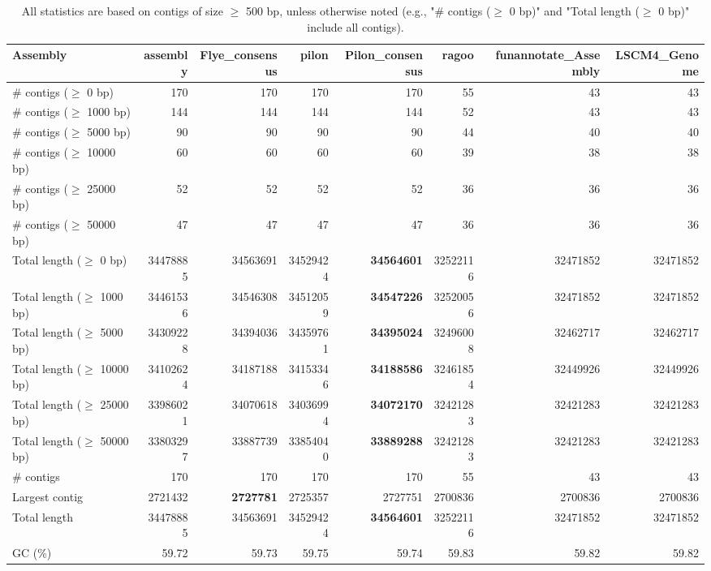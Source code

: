 \documentclass[12pt,a4paper]{article}
\begin{document}
\begin{table}[ht]
\begin{center}
\caption{All statistics are based on contigs of size $\geq$ 500 bp, unless otherwise noted (e.g., "\# contigs ($\geq$ 0 bp)" and "Total length ($\geq$ 0 bp)" include all contigs).}
\begin{tabular}{|l*{7}{|r}|}
\hline
Assembly & assembly & Flye\_consensus & pilon & Pilon\_consensus & ragoo & funannotate\_Assembly & LSCM4\_Genome \\ \hline
\# contigs ($\geq$ 0 bp) & 170 & 170 & 170 & 170 & 55 & 43 & 43 \\ \hline
\# contigs ($\geq$ 1000 bp) & 144 & 144 & 144 & 144 & 52 & 43 & 43 \\ \hline
\# contigs ($\geq$ 5000 bp) & 90 & 90 & 90 & 90 & 44 & 40 & 40 \\ \hline
\# contigs ($\geq$ 10000 bp) & 60 & 60 & 60 & 60 & 39 & 38 & 38 \\ \hline
\# contigs ($\geq$ 25000 bp) & 52 & 52 & 52 & 52 & 36 & 36 & 36 \\ \hline
\# contigs ($\geq$ 50000 bp) & 47 & 47 & 47 & 47 & 36 & 36 & 36 \\ \hline
Total length ($\geq$ 0 bp) & 34478885 & 34563691 & 34529424 & {\bf 34564601} & 32522116 & 32471852 & 32471852 \\ \hline
Total length ($\geq$ 1000 bp) & 34461536 & 34546308 & 34512059 & {\bf 34547226} & 32520056 & 32471852 & 32471852 \\ \hline
Total length ($\geq$ 5000 bp) & 34309228 & 34394036 & 34359761 & {\bf 34395024} & 32496008 & 32462717 & 32462717 \\ \hline
Total length ($\geq$ 10000 bp) & 34102624 & 34187188 & 34153346 & {\bf 34188586} & 32461854 & 32449926 & 32449926 \\ \hline
Total length ($\geq$ 25000 bp) & 33986021 & 34070618 & 34036994 & {\bf 34072170} & 32421283 & 32421283 & 32421283 \\ \hline
Total length ($\geq$ 50000 bp) & 33803297 & 33887739 & 33854040 & {\bf 33889288} & 32421283 & 32421283 & 32421283 \\ \hline
\# contigs & 170 & 170 & 170 & 170 & 55 & 43 & 43 \\ \hline
Largest contig & 2721432 & {\bf 2727781} & 2725357 & 2727751 & 2700836 & 2700836 & 2700836 \\ \hline
Total length & 34478885 & 34563691 & 34529424 & {\bf 34564601} & 32522116 & 32471852 & 32471852 \\ \hline
GC (\%) & 59.72 & 59.73 & 59.75 & 59.74 & 59.83 & 59.82 & 59.82 \\ \hline

\end{tabular}
\end{center}
\end{table}
\end{document}
